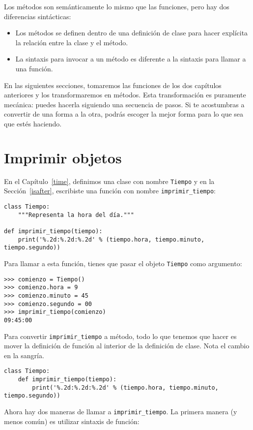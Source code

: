 \documentclass[10pt]{book}
\begin{document}
Los métodos son semánticamente lo mismo que las funciones, pero hay
dos diferencias sintácticas:

\begin{itemize}

\item Los métodos se definen dentro de una definición de clase para
hacer explícita la relación entre la clase y el método.

\item La sintaxis para invocar a un método es diferente a la
sintaxis para llamar a una función.

\end{itemize}

En las siguientes secciones, tomaremos las funciones de los dos
capítulos anteriores y los transformaremos en métodos.  Esta transformación es
puramente mecánica: puedes hacerla siguiendo una secuencia de
pasos.  Si te acostumbras a convertir de una forma a la otra,
podrás escoger la mejor forma para lo que sea que estés haciendo.


\section{Imprimir objetos}

En el Capítulo~\ref{time}, definimos una clase con nombre
{\tt Tiempo} y en la Sección~\ref{isafter}, escribiste
una función con nombre \verb"imprimir_tiempo":

\begin{verbatim}
class Tiempo:
    """Representa la hora del día."""

def imprimir_tiempo(tiempo):
    print('%.2d:%.2d:%.2d' % (tiempo.hora, tiempo.minuto, tiempo.segundo))
\end{verbatim}
%
Para llamar a esta función, tienes que pasar el objeto {\tt Tiempo} como
argumento:

\begin{verbatim}
>>> comienzo = Tiempo()
>>> comienzo.hora = 9
>>> comienzo.minuto = 45
>>> comienzo.segundo = 00
>>> imprimir_tiempo(comienzo)
09:45:00
\end{verbatim}
%
Para convertir \verb"imprimir_tiempo" a método, todo lo que tenemos que hacer es
mover la definición de función al interior de la definición de clase.  Nota
el cambio en la sangría.

\begin{verbatim}
class Tiempo:
    def imprimir_tiempo(tiempo):
        print('%.2d:%.2d:%.2d' % (tiempo.hora, tiempo.minuto, tiempo.segundo))
\end{verbatim}
%
Ahora hay dos maneras de llamar a \verb"imprimir_tiempo".  La primera manera
(y menos común) es utilizar sintaxis de función:
\end{document}
